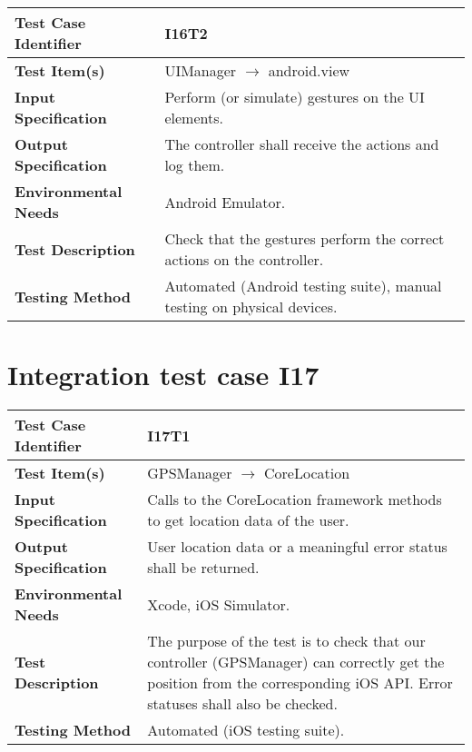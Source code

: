 \vspace{2em}

\noindent\begin{tabular}{l p{}}
    \hline
    \textbf{Test Case Identifier} & I16T2\\
    \hline
    \textbf{Test Item(s)} & UIManager $\rightarrow$ android.view \\
    \hline
    \textbf{Input Specification} & Perform (or simulate) gestures on the UI elements.\\
    \hline
    \textbf{Output Specification} & The controller shall receive the actions and log them. \\
    \hline
    \textbf{Environmental Needs} & Android Emulator. \\
    \hline
    \textbf{Test Description} & Check that the gestures perform the correct actions on the controller.\\
    \hline
    \textbf{Testing Method} & Automated (Android testing suite), manual testing on physical devices. \\
    \hline
\end{tabular}

\vspace{2em}

\section{Integration test case I17}

\begin{tabular}{l p{}}
    \hline
    \textbf{Test Case Identifier} & I17T1\\
    \hline
    \textbf{Test Item(s)} & GPSManager $\rightarrow$ CoreLocation \\
    \hline
    \textbf{Input Specification} & Calls to the CoreLocation framework methods to get location data of the user. \\
    \hline
    \textbf{Output Specification} & User location data or a meaningful error status shall be returned. \\
    \hline
    \textbf{Environmental Needs} & Xcode, iOS Simulator. \\
    \hline
    \textbf{Test Description} & The purpose of the test is to check that our controller (GPSManager) can correctly get the position from the corresponding iOS API. Error statuses shall also be checked. \\
    \hline
    \textbf{Testing Method} & Automated (iOS testing suite). \\
    \hline
\end{tabular}


